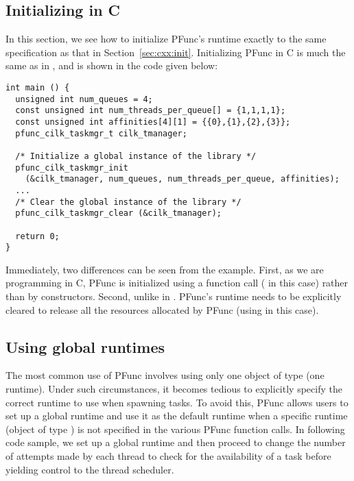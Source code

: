 \subsection{Initializing in C}
\label{sec:c:init}

In this section, we see how to initialize PFunc's runtime exactly to the same 
specification as that in Section~\ref{sec:cxx:init}. Initializing PFunc in C
is much the same as in \Cpp{}, and is shown in the code given below:

\begin{lstlisting}
int main () {
  unsigned int num_queues = 4;
  const unsigned int num_threads_per_queue[] = {1,1,1,1};
  const unsigned int affinities[4][1] = {{0},{1},{2},{3}};
  pfunc_cilk_taskmgr_t cilk_tmanager;

  /* Initialize a global instance of the library */
  pfunc_cilk_taskmgr_init 
    (&cilk_tmanager, num_queues, num_threads_per_queue, affinities);
  ...
  /* Clear the global instance of the library */
  pfunc_cilk_taskmgr_clear (&cilk_tmanager);

  return 0;
}
\end{lstlisting}

Immediately, two differences can be seen from the \Cpp{} example. First, as we
are programming in C, PFunc is initialized using a function call
( in this case) rather than by constructors.
Second, unlike in \Cpp{}. PFunc's runtime needs to be explicitly cleared to
release all the resources allocated by PFunc (using
 in this case).

\subsection{Using global runtimes}
The most common use of PFunc involves using only one object of type
 (one runtime). Under such circumstances, it becomes tedious to
explicitly specify the correct runtime to use when spawning tasks. To avoid
this, PFunc allows users to set up a global runtime and use it as the default
runtime when a specific runtime (object of type ) is not
specified in the various PFunc function calls. In following \Cpp{} code
sample, we set up a global runtime and then proceed to change the number of
attempts made by each thread to check for the availability of a task before 
yielding control to the thread scheduler.

